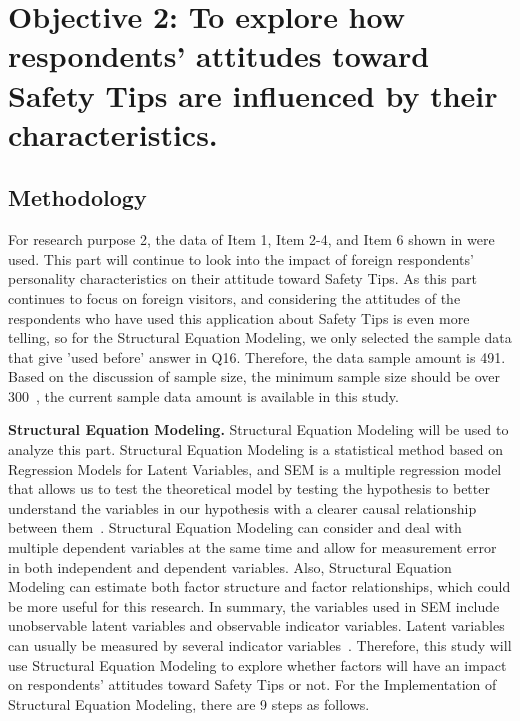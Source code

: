 \chapter{Objective 2: To explore how respondents' attitudes toward Safety Tips are influenced by their characteristics.}
\label{c5}

\section{Methodology}


For research purpose 2, the data of Item 1, Item 2-4, and Item 6 shown in  were used. This part will continue to look into the impact of foreign respondents' personality characteristics on their attitude toward Safety Tips. As this part continues to focus on foreign visitors, and considering the attitudes of the respondents who have used this application about Safety Tips is even more telling, so for the Structural Equation Modeling, we only selected the sample data that give 'used before' answer in Q16. Therefore, the data sample amount is 491. Based on the discussion of sample size, the minimum sample size should be over 300~\cite{ref15}, the current sample data amount is available in this study. 

\textbf{Structural Equation Modeling.} Structural Equation Modeling will be used to analyze this part. Structural Equation Modeling is a statistical method based on Regression Models for Latent Variables, and SEM is a multiple regression model that allows us to test the theoretical model by testing the hypothesis to better understand the variables in our hypothesis with a clearer causal relationship between them~\cite{ref13}. Structural Equation Modeling can consider and deal with multiple dependent variables at the same time and allow for measurement error in both independent and dependent variables. Also, Structural Equation Modeling can estimate both factor structure and factor relationships, which could be more useful for this research. In summary, the variables used in SEM include unobservable latent variables and observable indicator variables. Latent variables can usually be measured by several indicator variables~\cite{ref14}. Therefore, this study will use Structural Equation Modeling to explore whether factors will have an impact on respondents' attitudes toward Safety Tips or not. For the Implementation of Structural Equation Modeling, there are 9 steps as follows. 

